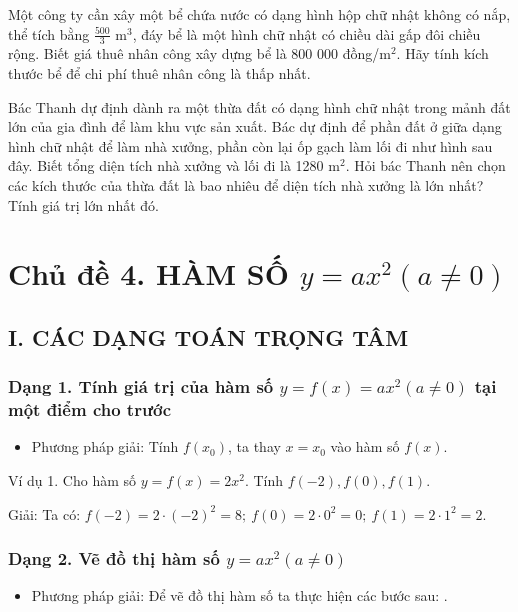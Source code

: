 \documentclass[%
    fontsize=12pt,%
    chapterprefix=false,%
    open=right,%
    twoside=false,%
    numbers=noenddot,%
    headings=optiontohead,%
    final,%
    DIV=15,%
    parskip=half %
]{scrbook}
\begin{document}
\begin{tuluan}
\item Một công ty cần xây một bể chứa nước có dạng hình hộp chữ nhật không có nắp, thể tích bằng $ \frac{500}{3} $ m$^3$, đáy bể là một hình chữ nhật có chiều dài gấp đôi chiều rộng. Biết giá thuê nhân công xây dựng bể là 800 000 đồng/m$^2$. Hãy tính kích thước bể để chi phí thuê nhân công là thấp nhất.

\item Bác Thanh dự định dành ra một thừa đất có dạng hình chữ nhật trong mảnh đất lớn của gia đình để làm khu vực sản xuất. Bác dự định để phần đất ở giữa dạng hình chữ nhật để làm nhà xưởng, phần còn lại ốp gạch làm lối đi như hình sau đây. Biết tổng diện tích nhà xưởng và lối đi là 1280 m$^2$. Hỏi bác Thanh nên chọn các kích thước của thừa đất là bao nhiêu để diện tích nhà xưởng là lớn nhất? Tính giá trị lớn nhất đó.

\end{tuluan}

\section{Chủ đề 4. HÀM SỐ $ y = ax^2 (a \neq 0) $}
\subsection{I. CÁC DẠNG TOÁN TRỌNG TÂM}
\subsubsection{Dạng 1. Tính giá trị của hàm số $ y = f(x) = ax^2 (a \neq 0) $ tại một điểm cho trước}

\begin{itemize}
  \item Phương pháp giải: Tính $ f(x_0) $, ta thay $ x = x_0 $ vào hàm số $ f(x) $.
\end{itemize}

Ví dụ 1. Cho hàm số $ y = f(x) = 2x^2 $. Tính $ f(-2), f(0), f(1) $.

Giải: Ta có: $ f(-2) = 2 \cdot (-2)^2 = 8; \ f(0) = 2 \cdot 0^2 = 0; \ f(1) = 2 \cdot 1^2 = 2. $
\subsubsection{Dạng 2. Vẽ đồ thị hàm số $ y = ax^2 (a \neq 0) $}

\begin{itemize}
  \item Phương pháp giải: Để vẽ đồ thị hàm số ta thực hiện các bước sau: .
\end{itemize}
\end{document}
